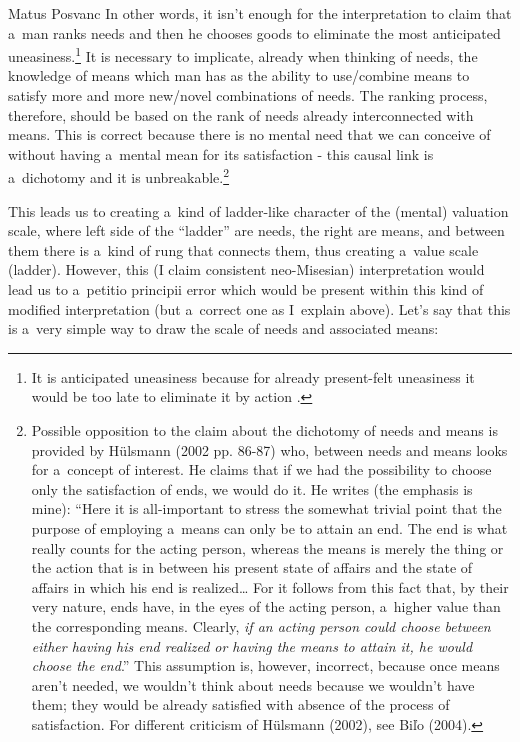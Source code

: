 \begin{artengenv}{Matus Posvanc}
In other words, it isn't enough for the interpretation to claim that a~man ranks needs and then he chooses goods to eliminate the most anticipated uneasiness.\footnote{It is anticipated uneasiness because for already present-felt uneasiness it would be too late to eliminate it by action 
\parencites[][]{Shackle1992Epistemics}[][]{Bilo2004Theory}.%
} It is necessary to implicate, already when thinking of needs, the knowledge of means which man has as the ability to use/combine means to satisfy more and more new/novel combinations of needs. The ranking process, therefore, should be based on the rank of needs already interconnected with means. This is correct because there is no mental need that we can conceive of without having a~mental mean for its satisfaction - this causal link is a~dichotomy and it is unbreakable.\footnote{Possible opposition to the claim about the dichotomy of needs and means is provided by Hülsmann (2002 pp. 86-87) who, between needs and means looks for a~concept of interest. He claims that if we had the possibility to choose only the satisfaction of ends, we would do it. He writes (the emphasis is mine): ``Here it is all-important to stress the somewhat trivial point that the purpose of employing a~means can only be to attain an end. The end is what really counts for the acting person, whereas the means is merely the thing or the action that is in between his present state of affairs and the state of affairs in which his end is realized… For it follows from this fact that, by their very nature, ends have, in the eyes of the acting person, a~higher value than the corresponding means. Clearly, \textit{if an acting person could choose between either having his end realized or having the means to attain it, he would choose the end}.'' This assumption is, however, incorrect, because once means aren't needed, we wouldn't think about needs because we wouldn't have them; they would be already satisfied with absence of the process of satisfaction. For different criticism of Hülsmann (2002), see Biľo (2004).}



This leads us to creating a~kind of ladder-like character of the (mental) valuation scale, where left side of the ``ladder'' are needs, the right are means, and between them there is a~kind of rung that connects them, thus creating a~value scale (ladder). However, this (I claim consistent neo-Misesian) interpretation would lead us to a~petitio principii error which would be present within this kind of modified interpretation (but a~correct one as I~explain above). Let's say that this is a~very simple way to draw the scale of needs and associated means:



\end{artengenv}
